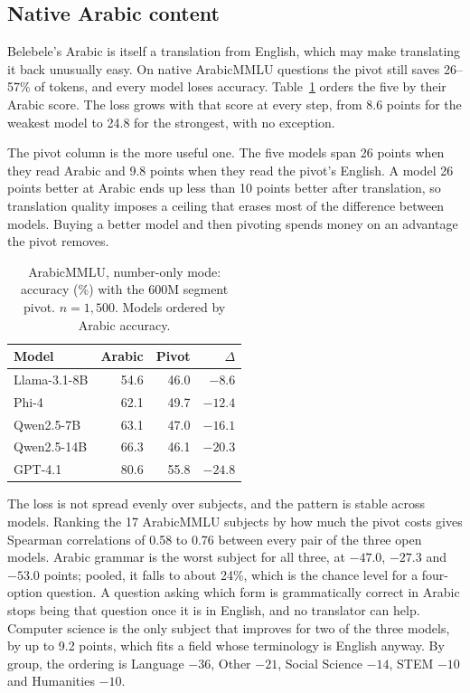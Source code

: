 \documentclass[conference,a4paper]{IEEEtran}
\begin{document}
\subsection{Native Arabic content}
\label{sec:native}

Belebele's Arabic is itself a translation from English, which may make
translating it back unusually easy. On native ArabicMMLU questions the pivot
still saves 26--57\% of tokens, and every model loses accuracy.
Table~\ref{tab:ammlu} orders the five by their Arabic score. The loss grows
with that score at every step, from 8.6 points for the weakest model to 24.8
for the strongest, with no exception.

The pivot column is the more useful one. The five models span 26 points when
they read Arabic and 9.8 points when they read the pivot's English. A model 26
points better at Arabic ends up less than 10 points better after translation,
so translation quality imposes a ceiling that erases most of the difference
between models. Buying a better model and then pivoting spends money on an
advantage the pivot removes.

\begin{table}[t]
\caption{ArabicMMLU, number-only mode: accuracy (\%) with the 600M segment
pivot. $n = 1{,}500$. Models ordered by Arabic accuracy.}
\label{tab:ammlu}
\centering
\footnotesize
\setlength{\tabcolsep}{4pt}
\begin{tabular}{lrrr}
\toprule
Model & Arabic & Pivot & $\Delta$ \\
\midrule
Llama-3.1-8B & 54.6 & 46.0 & $-8.6$ \\
Phi-4        & 62.1 & 49.7 & $-12.4$ \\
Qwen2.5-7B   & 63.1 & 47.0 & $-16.1$ \\
Qwen2.5-14B  & 66.3 & 46.1 & $-20.3$ \\
GPT-4.1      & 80.6 & 55.8 & $-24.8$ \\
\bottomrule
\end{tabular}
\end{table}

The loss is not spread evenly over subjects, and the pattern is stable across
models. Ranking the 17 ArabicMMLU subjects by how much the pivot costs gives
Spearman correlations of 0.58 to 0.76 between every pair of the three open
models. Arabic grammar is the worst subject for all three, at $-47.0$, $-27.3$
and $-53.0$ points; pooled, it falls to about 24\%, which is the chance level
for a four-option question. A question asking which form is grammatically
correct in Arabic stops being that question once it is in English, and no
translator can help. Computer science is the only subject that improves for two
of the three models, by up to 9.2 points, which fits a field whose terminology
is English anyway. By group, the ordering is Language $-36$, Other $-21$,
Social Science $-14$, STEM $-10$ and Humanities $-10$.
\end{document}
